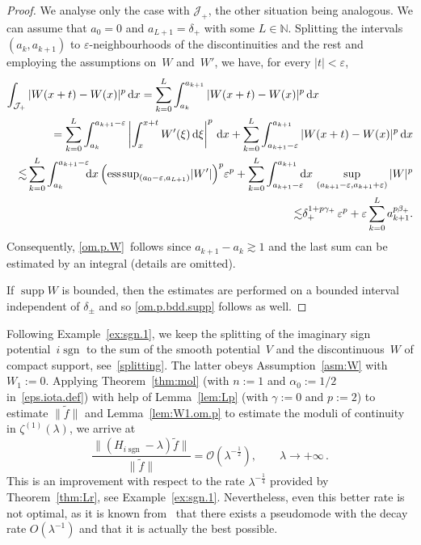 \begin{proof}
We analyse only the case with ${\mathcal J}_+$,
the other situation being analogous. 
We can assume that $a_0=0$ and $a_{L+1}=\delta_+$ 
with some $ L \in {\mathbb{N}}$. 
Splitting the intervals $(a_k,a_{k+1})$ to ${\varepsilon}$-neighbourhoods 
of the discontinuities and the rest and employing the assumptions on~$W$ and~$W'$, 
we have, for every $|t| < {\varepsilon}$,
\begin{eqnarray*}
\lefteqn{
\int_{{\mathcal J}_+}|W(x+t)-W(x)|^p \, {\mathrm{d}} x
= \sum_{k=0}^L \int_{a_k}^{a_{k+1}} |W(x+t)-W(x)|^p \, {\mathrm{d}} x
}
\\
&& 
= \sum_{k=0}^L \int_{a_k}^{a_{k+1}-{\varepsilon}} 
\left| \int_{x}^{x+t} W'(\xi) \, {\mathrm{d}}\xi \right|^p \, {\mathrm{d}} x
+ \sum_{k=0}^L \int_{a_{k+1}-{\varepsilon}}^{a_{k+1}} |W(x+t)-W(x)|^p \, {\mathrm{d}} x
\\ 
&& 
{\lesssim}
\sum_{k=0}^L \int_{a_k}^{a_{k+1}-{\varepsilon}} \!\!\! {\mathrm{d}} x \,
\Big({\mathop{\mathrm{ess\;\!sup}}}_{(a_0-{\varepsilon},a_{L+1})} |W'|\Big)^p {\varepsilon}^p 
+\sum_{k=0}^L \int_{a_{k+1}-{\varepsilon}}^{a_{k+1}} \!\!\! {\mathrm{d}} x \, 
\sup_{(a_{k+1}-{\varepsilon},a_{k+1}+{\varepsilon})} |W|^p 
\\ 
&& 
{\lesssim} \delta_+^{1+p\gamma_+} \, {\varepsilon}^p  
+ {\varepsilon}  \sum_{k=0}^L a_{k+1}^{p\beta_+}.
\end{eqnarray*}
Consequently, 
\eqref{om.p.W}~follows since $a_{k+1}-a_k {\gtrsim} 1$ 
and the last sum can be estimated
by an integral (details are omitted).

If ${\mathop{\mathrm{supp}}\nolimits} W$ is bounded, then the estimates are performed on a bounded interval independent of $\delta_\pm$ and so \eqref{om.p.bdd.supp} follows as well.
\end{proof}

\begin{Example} 
\label{ex:sgn.2}
Following Example~\ref{ex:sgn.1},
we keep the splitting of the imaginary sign potential~$i{\mathop{\mathrm{sgn}}\nolimits}$
to the sum of the smooth potential~$V$ and the discontinuous~$W$
of compact support, see~\eqref{splitting}.
The latter obeys Assumption~\ref{asm:W} with $W_1:=0$.
Applying Theorem~\ref{thm:mol} 
(with $n:=1$ and $\alpha_0:=1/2$ in~\eqref{eps.iota.def})
with help of Lemma~\ref{lem:Lp} (with $\gamma:=0$ and $p:=2$) to estimate $\|\tilde f\|$ 
and Lemma~\ref{lem:W1.om.p} to estimate 
the moduli of continuity in $\zeta^{(1)}(\lambda)$,
we arrive at
		\begin{equation*}
	\frac{\|(H_{i {\mathop{\mathrm{sgn}}\nolimits}}-\lambda)\tilde f\|}{\|\tilde f\|} 
	= {\mathcal{O}} \left( \lambda^{-\frac12} \right), \qquad \lambda \to +\infty
	\,.  
	\end{equation*}
		This is an improvement with respect 
	to the rate $\lambda^{-\frac{1}{4}}$ 
	provided by Theorem~\ref{thm:Lr}, see Example~\ref{ex:sgn.1}.
	Nevertheless, 
	even this better rate is not optimal,
	as it is known from~\cite{HK} that there exists 
	a pseudomode with the decay rate $O(\lambda^{-1})$ 
	and that it is actually the best possible.
\end{Example}

